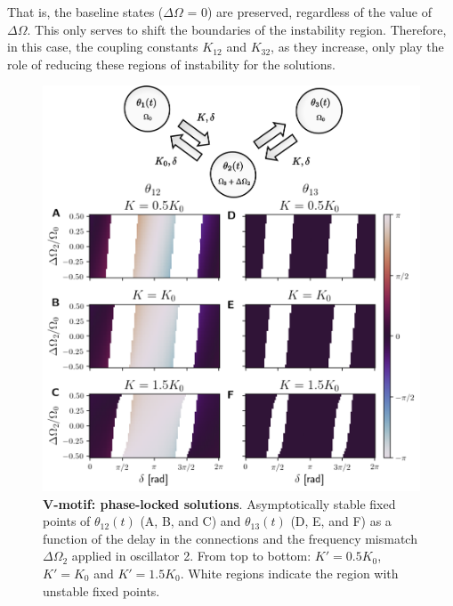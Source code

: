 \documentclass[../main.tex]{subfiles}
\begin{document}
That is, the baseline states ($\Delta\Omega$ = 0) are preserved, regardless of the value of $\Delta\Omega$. 
This only serves to shift the boundaries of the instability region.
Therefore, in this case, the coupling constants $K_{12}$ and $K_{32}$, as they increase, only play the role of reducing these regions of instability for the solutions.
\begin{figure}[!htb]
    \centering
    \includegraphics[width=\textwidth]{chapter2/figures/vmotif_different_omega_1_edited.png}
    \caption{\textbf{V-motif: phase-locked solutions}.
    Asymptotically stable fixed points of $\theta_{12}(t)$ (A, B, and C) and $\theta_{13}(t)$ (D, E, and F) as a function of the delay in the connections and the frequency mismatch $\Delta\Omega_2$ applied in oscillator 2.
    From top to bottom: $K'=0.5K_0$, $K'=K_0$ and $K'=1.5K_0$.
    White regions indicate the region with unstable fixed points.}
    \label{fig:vmotif_omega1}
\end{figure}
\clearpage
\end{document}

